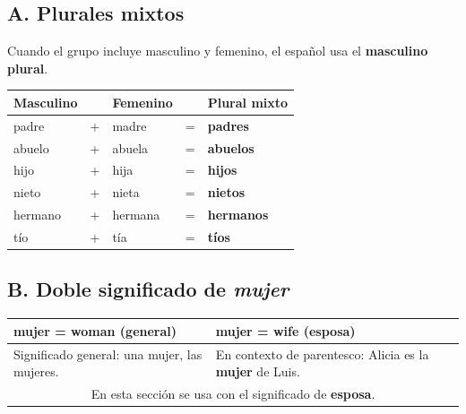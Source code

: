 \documentclass[a4paper,11pt]{article}
\begin{document}
\subsection*{\textcolor{verde}{A. Plurales mixtos}}

Cuando el grupo incluye masculino y femenino, el español usa el \textbf{masculino plural}.

\vspace{0.3cm}

\begin{center}
\renewcommand{\arraystretch}{1.5}
\begin{tabular}{|>{\centering\arraybackslash}p{3cm}|>{\centering\arraybackslash}p{1cm}|>{\centering\arraybackslash}p{3cm}|>{\centering\arraybackslash}p{1cm}|>{\centering\arraybackslash}p{3cm}|}
\hline
\rowcolor{azulg!10}
\textbf{\textcolor{azulg}{Masculino}} & & \textbf{\textcolor{rojog}{Femenino}} & & \textbf{Plural mixto} \\
\hline
padre & + & madre & = & \textbf{padres} \\
\hline
abuelo & + & abuela & = & \textbf{abuelos} \\
\hline
hijo & + & hija & = & \textbf{hijos} \\
\hline
nieto & + & nieta & = & \textbf{nietos} \\
\hline
hermano & + & hermana & = & \textbf{hermanos} \\
\hline
tío & + & tía & = & \textbf{tíos} \\
\hline
\end{tabular}
\end{center}

\vspace{0.5cm}


\subsection*{\textcolor{naranja}{B. Doble significado de \textit{mujer}}}

\begin{center}
\renewcommand{\arraystretch}{1.4}
\begin{tabular}{|p{6cm}|p{6cm}|}
\hline
\rowcolor{naranja!10}
\textbf{mujer = woman} (general) & \textbf{mujer = wife} (esposa) \\
\hline
Significado general: una mujer, las mujeres. & En contexto de parentesco: Alicia es la \textbf{mujer} de Luis. \\
\hline
\multicolumn{2}{|c|}{\cellcolor{gris}\small En esta sección se usa con el significado de \textbf{esposa}.} \\
\hline
\end{tabular}
\end{center}
\end{document}
